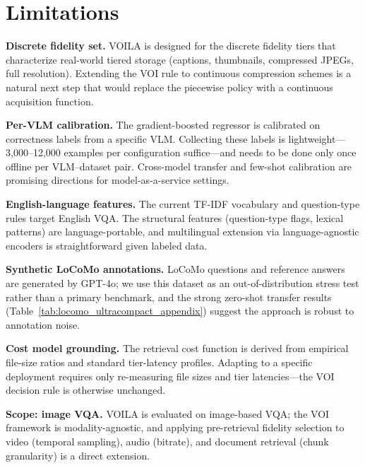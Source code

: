 \section*{Limitations}
\label{sec:limitations}


\textbf{Discrete fidelity set.}
\textsc{VOILA} is designed for the discrete fidelity tiers that characterize real-world tiered storage (captions, thumbnails, compressed JPEGs, full resolution).
Extending the VOI rule to continuous compression schemes is a natural next step that would replace the piecewise policy with a continuous acquisition function.

\textbf{Per-VLM calibration.}
The gradient-boosted regressor is calibrated on correctness labels from a specific VLM.
Collecting these labels is lightweight---3{,}000--12{,}000 examples per configuration suffice---and needs to be done only once offline per VLM--dataset pair.
Cross-model transfer and few-shot calibration are promising directions for model-as-a-service settings.

\textbf{English-language features.}
The current TF-IDF vocabulary and question-type rules target English VQA.
The structural features (question-type flags, lexical patterns) are language-portable, and multilingual extension via language-agnostic encoders is straightforward given labeled data.

\textbf{Synthetic LoCoMo annotations.}
\providecommand{\locomotableref}{\ref{tab:locomo_ultracompact_appendix}}
LoCoMo questions and reference answers are generated by GPT-4o; we use this dataset as an out-of-distribution stress test rather than a primary benchmark, and the strong zero-shot transfer results (Table~\locomotableref) suggest the approach is robust to annotation noise.

\textbf{Cost model grounding.}
The retrieval cost function is derived from empirical file-size ratios and standard tier-latency profiles.
Adapting to a specific deployment requires only re-measuring file sizes and tier latencies---the VOI decision rule is otherwise unchanged.

\textbf{Scope: image VQA.}
\textsc{VOILA} is evaluated on image-based VQA; the VOI framework is modality-agnostic, and applying pre-retrieval fidelity selection to video (temporal sampling), audio (bitrate), and document retrieval (chunk granularity) is a direct extension.
